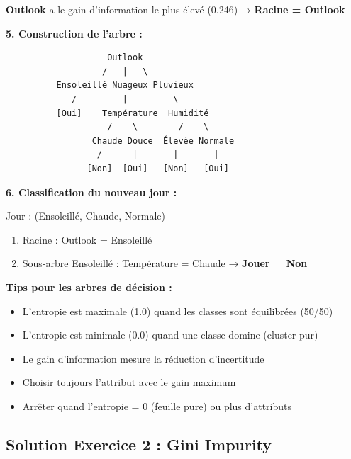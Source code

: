 \documentclass[11pt,a4paper]{article}
\begin{document}
\begin{solutionbox}
\textbf{Outlook} a le gain d'information le plus élevé (0.246) → \textbf{Racine = Outlook}

\textbf{5. Construction de l'arbre :}

\begin{verbatim}
                    Outlook
                   /   |   \
          Ensoleillé Nuageux Pluvieux
             /         |         \
          [Oui]    Température  Humidité
                    /    \        /    \
                 Chaude Douce  Élevée Normale
                  /      |       |       |
                [Non]  [Oui]   [Non]   [Oui]
\end{verbatim}

\textbf{6. Classification du nouveau jour :}

Jour : (Ensoleillé, Chaude, Normale)
\begin{enumerate}
    \item Racine : Outlook = Ensoleillé
    \item Sous-arbre Ensoleillé : Température = Chaude → \textbf{Jouer = Non}
\end{enumerate}
\end{solutionbox}

\begin{tipbox}
\textbf{Tips pour les arbres de décision :}
\begin{itemize}
    \item L'entropie est maximale (1.0) quand les classes sont équilibrées (50/50)
    \item L'entropie est minimale (0.0) quand une classe domine (cluster pur)
    \item Le gain d'information mesure la réduction d'incertitude
    \item Choisir toujours l'attribut avec le gain maximum
    \item Arrêter quand l'entropie = 0 (feuille pure) ou plus d'attributs
\end{itemize}
\end{tipbox}

\subsection{Solution Exercice 2 : Gini Impurity}
\end{document}
